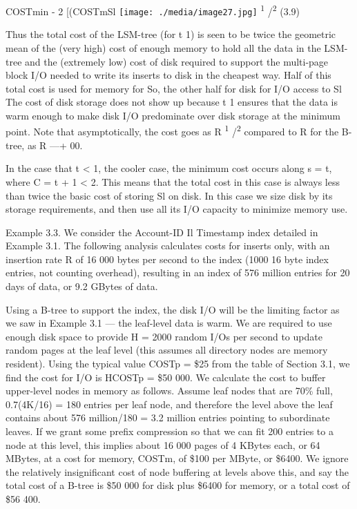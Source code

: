 \documentclass[a4paper,11pt,notitlepage,twoside,openright]{article}
\begin{document}
COSTmin - 2 {[}(COSTmSl
\texttt{[image: ./media/image27.jpg]}
\textsuperscript{1} /\textsuperscript{2} (3.9)


Thus the total cost of the LSM-tree (for t 1) is seen to be twice the
geometric mean of the (very high) cost of enough memory to hold all the
data in the LSM-tree and the (extremely low) cost of disk required to
support the multi-page block I/O needed to write its inserts to disk in
the cheapest way. Half of this total cost is used for memory for So, the
other half for disk for I/O access to Sl The cost of disk storage does
not show up because t 1 ensures that the data is warm enough to make
disk I/O predominate over disk storage at the minimum point. Note that
asymptotically, the cost goes as R \textsuperscript{1}
/\textsuperscript{2} compared to R for the B-tree, as R ---+ 00.

In the case that t \textless{} 1, the cooler case, the minimum cost
occurs along s = t, where C = t + 1 \textless{} 2. This means that the
total cost in this case is always less than twice the basic cost of
storing Sl on disk. In this case we size disk by its storage
requirements, and then use all its I/O capacity to minimize memory use.

Example 3.3. We consider the Account-ID Il Timestamp index detailed in
Example 3.1. The following analysis calculates costs for inserts only,
with an insertion rate R of 16 000 bytes per second to the index (1000
16 byte index entries, not counting overhead), resulting in an index of
576 million entries for 20 days of data, or 9.2 GBytes of data.

Using a B-tree to support the index, the disk I/O will be the limiting
factor as we saw in Example 3.1 --- the leaf-level data is warm. We are
required to use enough disk space to provide H = 2000 random I/Os per
second to update random pages at the leaf level (this assumes all
directory nodes are memory resident). Using the typical value COSTp =
\$25 from the table of Section 3.1, we find the cost for I/O is HCOSTp =
\$50 000. We calculate the cost to buffer upper-level nodes in memory as
follows. Assume leaf nodes that are 70\% full, 0.7(4K/16) = 180 entries
per leaf node, and therefore the level above the leaf contains about 576
million/180 = 3.2 million entries pointing to subordinate leaves. If we
grant some prefix compression so that we can fit 200 entries to a node
at this level, this implies about 16 000 pages of 4 KBytes each, or 64
MBytes, at a cost for memory, COSTm, of \$100 per MByte, or \$6400. We
ignore the relatively insignificant cost of node buffering at levels
above this, and say the total cost of a B-tree is \$50 000 for disk plus
\$6400 for memory, or a total cost of \$56 400.
\end{document}
